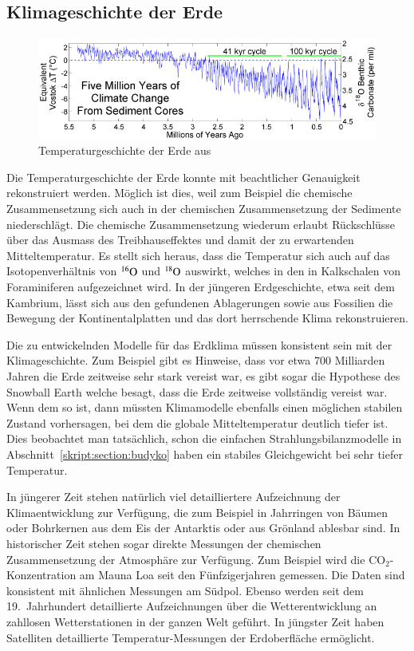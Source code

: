 \subsection{Klimageschichte der Erde\label{subsection:klimageschichte}}
\begin{figure}
\centering
\includegraphics[width=0.7\hsize]{chapters/1/FiveMyrClimateChange.png}
\caption{Temperaturgeschichte der Erde aus 
\cite{skript:geologictemperaturerecord}
\label{skript:history:temperatur}}
\end{figure}%
Die Temperaturgeschichte der Erde konnte mit beachtlicher
Genauigkeit rekonstruiert werden.
Möglich ist dies, weil zum Beispiel die chemische Zusammensetzung sich
auch in der chemischen Zusammensetzung der Sedimente niederschlägt.
Die chemische Zusammensetzung wiederum erlaubt Rückschlüsse über das
Ausmass des Treibhauseffektes und damit der zu erwartenden Mitteltemperatur.
Es stellt sich heraus, dass die Temperatur sich auch auf das
Isotopenverhältnis von $\mathstrut^{16}\text{O}$ und
$\mathstrut^{18}\text{O}$ auswirkt, welches in den in Kalkschalen von
Foraminiferen
%
aufgezeichnet wird.
In der jüngeren Erdgeschichte, etwa seit dem Kambrium, lässt sich aus
%
den gefundenen Ablagerungen sowie aus Fossilien die Bewegung der
Kontinentalplatten und das dort herrschende Klima rekonstruieren.

Die zu entwickelnden Modelle für das Erdklima müssen konsistent sein
mit der Klimageschichte.
Zum Beispiel gibt es Hinweise, dass vor etwa 700 Milliarden Jahren die
Erde zeitweise sehr stark vereist war, es gibt sogar die Hypothese des
Snowball Earth welche besagt, dass die Erde zeitweise vollständig
%
vereist war.
Wenn dem so ist, dann müssten Klimamodelle ebenfalls einen möglichen
stabilen Zustand
vorhersagen, bei dem die globale Mitteltemperatur deutlich tiefer ist.
Dies beobachtet man tatsächlich, schon die einfachen
Strahlungsbilanzmodelle in Abschnitt~\ref{skript:section:budyko}
haben ein stabiles Gleichgewicht bei sehr tiefer Temperatur.

In jüngerer Zeit stehen natürlich viel detailliertere Aufzeichnung der
Klimaentwicklung zur Verfügung, die zum Beispiel in Jahrringen von Bäumen
oder Bohrkernen aus dem Eis der Antarktis oder aus Grönland ablesbar sind.
In historischer Zeit stehen sogar direkte Messungen der chemischen
Zusammensetzung der Atmosphäre zur Verfügung.
Zum Beispiel wird die $\text{CO}_2$-Konzentration am Mauna Loa seit den 
Fünfzigerjahren gemessen.
Die Daten sind konsistent mit ähnlichen Messungen am Südpol.
Ebenso werden seit dem 19.~Jahrhundert detaillierte Aufzeichnungen
über die Wetterentwicklung an zahllosen Wetterstationen in der ganzen
Welt geführt.
In jüngster Zeit haben Satelliten
detaillierte Temperatur-Messungen der Erdoberfläche
ermöglicht.

